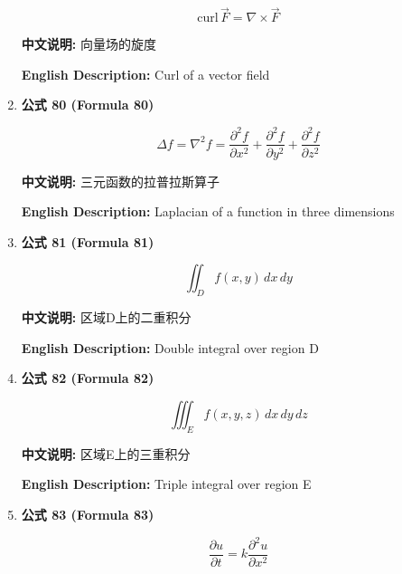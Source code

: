 \documentclass[12pt,a4paper]{article}
\begin{document}
\begin{enumerate}[leftmargin=*]
\begin{equation}
\text{curl}\, \vec{F} = \nabla \times \vec{F}
\end{equation}

\textbf{中文说明:} 向量场的旋度

\textbf{English Description:} Curl of a vector field

\vspace{0.5cm}

\item \textbf{公式 80 (Formula 80)}

\begin{equation}
\Delta f = \nabla^2 f = \frac{\partial^2 f}{\partial x^2} + \frac{\partial^2 f}{\partial y^2} + \frac{\partial^2 f}{\partial z^2}
\end{equation}

\textbf{中文说明:} 三元函数的拉普拉斯算子

\textbf{English Description:} Laplacian of a function in three dimensions

\vspace{0.5cm}

\item \textbf{公式 81 (Formula 81)}

\begin{equation}
\iint_D f(x, y)\,dx\,dy
\end{equation}

\textbf{中文说明:} 区域D上的二重积分

\textbf{English Description:} Double integral over region D

\vspace{0.5cm}

\item \textbf{公式 82 (Formula 82)}

\begin{equation}
\iiint_E f(x, y, z)\,dx\,dy\,dz
\end{equation}

\textbf{中文说明:} 区域E上的三重积分

\textbf{English Description:} Triple integral over region E

\vspace{0.5cm}

\item \textbf{公式 83 (Formula 83)}

\begin{equation}
\frac{\partial u}{\partial t} = k \frac{\partial^2 u}{\partial x^2}
\end{equation}


\end{enumerate}
\end{document}
